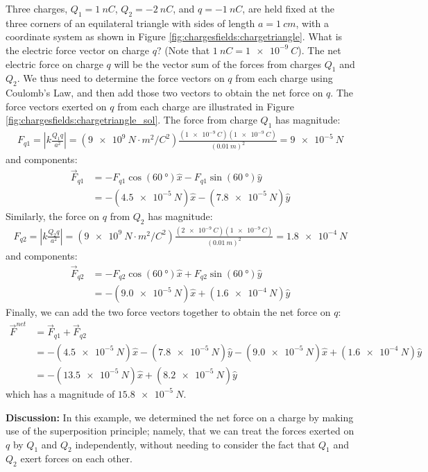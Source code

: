 \begin{example}{\label{ex:chargesfields:chargetriangle}Three charges, $Q_1=\SI{1}{nC}$, $Q_2=\SI{-2}{nC}$, and $q=\SI{-1}{nC}$, are held fixed at the three corners of an equilateral triangle with sides of length $a=\SI{1}{cm}$, with a coordinate system as shown in Figure \ref{fig:chargesfields:chargetriangle}. What is the electric force vector on charge $q$? (Note that $\SI{1}{nC}=\SI{1e-9}{C}$).
}
The net electric force on charge $q$ will be the vector sum of the forces from charges $Q_1$ and $Q_2$. We thus need to determine the force vectors on $q$ from each charge using Coulomb's Law, and then add those two vectors to obtain the net force on $q$. The force vectors exerted on $q$ from each charge are illustrated in Figure \ref{fig:chargesfields:chargetriangle_sol}.
The force from charge $Q_1$ has magnitude:
\begin{align*}
F_{q1}=\left |k\frac{Q_1q}{a^2}\right |=(\SI{9e9}{N\cdot m^2/C^{2}})\frac{(\SI{1e-9}{C})(\SI{1e-9}{C})}{(\SI{0.01}{m})^2}=\SI{9e-5}{N}
\end{align*}
and components:
\begin{align*}
\vec F_{q1}&=-F_{q1}\cos(\SI{60}{\degree})\hat x-F_{q1}\sin(\SI{60}{\degree})\hat y\\
&=-(\SI{4.5e-5}{N})\hat x-(\SI{7.8e-5}{N})\hat y
\end{align*}
Similarly, the force on $q$ from $Q_2$ has magnitude:
\begin{align*}
F_{q2}=\left |k\frac{Q_2q}{a^2}\right |=(\SI{9e9}{N\cdot m^2/C^{2}})\frac{(\SI{2e-9}{C})(\SI{1e-9}{C})}{(\SI{0.01}{m})^2}=\SI{1.8e-4}{N}
\end{align*}
and components:
\begin{align*}
\vec F_{q2}&=-F_{q2}\cos(\SI{60}{\degree})\hat x+F_{q2}\sin(\SI{60}{\degree})\hat y\\
&=-(\SI{9.0e-5}{N})\hat x+(\SI{1.6e-4}{N})\hat y
\end{align*}
Finally, we can add the two force vectors together to obtain the net force on $q$:
\begin{align*}
\vec F^{net}&=\vec F_{q1}+\vec F_{q2}\\
&=-(\SI{4.5e-5}{N})\hat x-(\SI{7.8e-5}{N})\hat y-(\SI{9.0e-5}{N})\hat x+(\SI{1.6e-4}{N})\hat y\\
&=-(\SI{13.5e-5}{N})\hat x+(\SI{8.2e-5}{N})\hat y
\end{align*}
which has a magnitude of $\SI{15.8e-5}{N}$.

\textbf{Discussion:} In this example, we determined the net force on a charge by making use of the superposition principle; namely, that we can treat the forces exerted on $q$ by $Q_1$ and $Q_2$ independently, without needing to consider the fact that $Q_1$ and $Q_2$ exert forces on each other.
\end{example}


